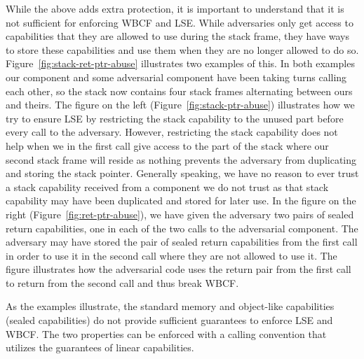 \documentclass[acmsmall,review,anonymous]{acmart}\settopmatter{printfolios=true,printccs=false,printacmref=false}
\begin{document}
While the above adds extra protection, it is important to understand that it is not sufficient for enforcing WBCF and LSE.
While adversaries only get access to capabilities that they are allowed to use during the stack frame, they have ways to store these capabilities and use them when they are no longer allowed to do so.
Figure~\ref{fig:stack-ret-ptr-abuse} illustrates two examples of this.
In both examples our component and some adversarial component have been taking turns calling each other, so the stack now contains four stack frames alternating between ours and theirs.
The figure on the left (Figure~\ref{fig:stack-ptr-abuse}) illustrates how we try to ensure LSE by restricting the stack capability to the unused part before every call to the adversary.
However, restricting the stack capability does not help when we in the first call give access to the part of the stack where our second stack frame will reside as nothing prevents the adversary from duplicating and storing the stack pointer.
Generally speaking, we have no reason to ever trust a stack capability received from a component we do not trust as that stack capability may have been duplicated and stored for later use.
In the figure on the right (Figure~\ref{fig:ret-ptr-abuse}), we have given the adversary two pairs of sealed return capabilities, one in each of the two calls to the adversarial component.
The adversary may have stored the pair of sealed return capabilities from the first call in order to use it in the second call where they are not allowed to use it.
The figure illustrates how the adversarial code uses the return pair from the first call to return from the second call and thus break WBCF.

As the examples illustrate, the standard memory and object-like capabilities (sealed capabilities) do not provide sufficient guarantees to enforce LSE and WBCF.
The two properties can be enforced with a calling convention that utilizes the guarantees of linear capabilities.
\end{document}
